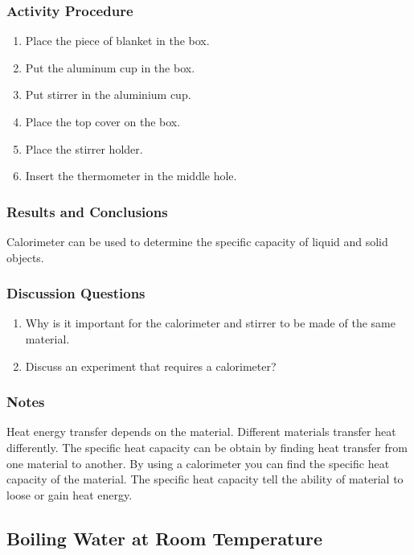 \subsubsection*{Activity Procedure}
\begin{enumerate}
\item{Place the piece of blanket in the box.}
\item{Put the aluminum cup in the box.}
\item{Put stirrer in the aluminium cup.}
\item{Place the top cover on the box.}
\item{Place the stirrer holder.}
\item{Insert the thermometer in the middle hole.}
\end{enumerate}

\subsubsection*{Results and Conclusions}
Calorimeter can be used to determine the specific capacity of liquid and solid objects.

\subsubsection*{Discussion Questions}
\begin{enumerate}
\item{Why is it important for the calorimeter and stirrer to be made of the same material.}
\item{Discuss an experiment that requires a calorimeter?}
\end{enumerate}

\subsubsection*{Notes}
Heat energy transfer depends on the material. Different materials transfer heat differently. The specific heat capacity can be obtain by finding heat transfer from one material to another. By using a calorimeter 
you can find the specific heat capacity of the material. The specific heat capacity tell the ability of material to loose or gain heat energy.



\subsection{Boiling Water at Room Temperature}

